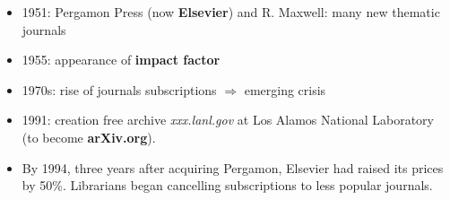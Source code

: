 \documentclass[10pt,compress,serif]{beamer}
\begin{document}
 
 \begin{frame}[t]%
 \vskip1cm%
\begin{itemize}

 \item 1951: Pergamon Press (now \textbf{Elsevier}) and R. Maxwell: many new thematic journals
 \item 1955: appearance of \textbf{impact factor}
 \item 1970s: rise of journals subscriptions $\Rightarrow$ emerging crisis
 \item 1991: creation free archive \textit{xxx.lanl.gov} at Los Alamos National Laboratory (to become \textbf{arXiv.org}).
\item By 1994, three years after acquiring Pergamon, Elsevier had raised its prices by 50\%. Librarians began cancelling subscriptions to less popular journals.
\end{itemize}
\end{frame}

 
\end{document}
